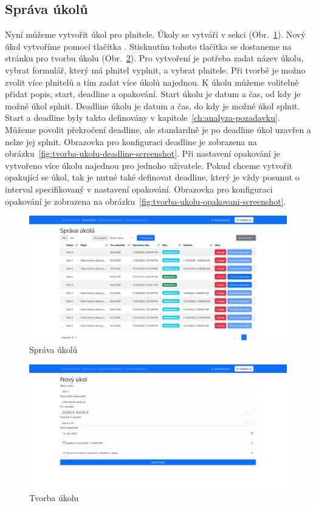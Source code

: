 \subsection{Správa úkolů}\label{subsec:sprava-ukolu}

Nyní můžeme vytvořit úkol pro plnitele.
Úkoly se vytváří v sekci  (Obr.~\ref{fig:sprava-ukolu-screenshot}).
Nový úkol vytvoříme pomocí tlačítka .
Stisknutím tohoto tlačítka se dostaneme na stránku pro tvorbu úkolu (Obr.~\ref{fig:tvorba-ukolu-screenshot}).
Pro vytvoření je potřeba zadat název úkolu, vybrat formulář, který má plnitel vyplnit, a vybrat plnitele.
Při tvorbě je možno zvolit více plnitelů a tím zadat více úkolů najednou.
K úkolu můžeme volitelně přidat popis, start, deadline a opakování.
Start úkolu je datum a čas, od kdy je možné úkol splnit.
Deadline úkolu je datum a čas, do kdy je možné úkol splnit.
Start a deadline byly takto definovány v kapitole~\ref{ch:analyza-pozadavku}.
Můžeme povolit překročení deadline, ale standardně je po deadline úkol uzavřen a nelze jej splnit.
Obrazovka pro konfiguraci deadline je zobrazena na obrázku~\ref{fig:tvorba-ukolu-deadline-screenshot}.
Při nastavení opakování je vytvořeno více úkolu najednou pro jednoho uživatele.
Pokud chceme vytvořit opakující se úkol, tak je nutné také definovat deadline, který je vždy posunut o interval specifikovaný v nastavení opakování.
Obrazovka pro konfiguraci opakování je zobrazena na obrázku~\ref{fig:tvorba-ukolu-opakovani-screenshot}.

\begin{figure}[H]
    \includegraphics[width=\textwidth]{../img/screenshots/sprava-ukolu}
    \caption{Správa úkolů}\label{fig:sprava-ukolu-screenshot}
\end{figure}

\begin{figure}[H]
    \includegraphics[width=\textwidth]{../img/screenshots/tvorba-ukolu}
    \caption{Tvorba úkolu}\label{fig:tvorba-ukolu-screenshot}
\end{figure}

